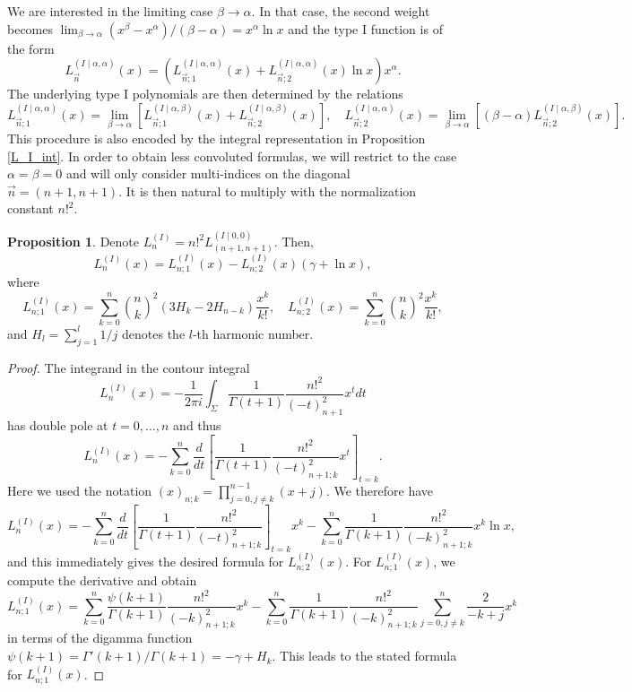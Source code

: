 \documentclass[a4paper,12pt,oneside]{article}
\theoremstyle{definition}
\newtheorem{prop}[defi]{Proposition}
\begin{document}
We are interested in the limiting case $\beta\to\alpha$. In that case, the second weight becomes  $\lim_{\beta\to\alpha} (x^\beta-x^\alpha)/(\beta-\alpha) = x^\alpha \ln x $
and the type I function is of the form
$$L_{\vec{n}}^{(I\mid \alpha,\alpha)}(x) = (L_{\vec{n};1}^{(I\mid \alpha,\alpha)}(x) + L_{\vec{n};2}^{(I\mid \alpha,\alpha)}(x) \ln x) x^\alpha. $$
The underlying type I polynomials are then determined by the relations
$$L_{\vec{n};1}^{(I\mid \alpha,\alpha)}(x) = \lim_{\beta\to\alpha} [L_{\vec{n};1}^{(I\mid \alpha,\beta)}(x)+L_{\vec{n};2}^{(I\mid \alpha,\beta)}(x)],
\quad  L_{\vec{n};2}^{(I\mid \alpha,\alpha)}(x) = \lim_{\beta\to\alpha} [(\beta-\alpha)L_{\vec{n};2}^{(I\mid \alpha,\beta)}(x)].$$
This procedure is also encoded by the integral representation in Proposition \ref{L_I_int}. In order to obtain less convoluted formulas, we will restrict to the case $\alpha=\beta=0$ and will only consider multi-indices on the diagonal $\vec{n}=(n+1,n+1)$. It is then natural to multiply with the normalization constant $n!^2$.

\begin{prop} \label{L_I_form}
    Denote $L_{n}^{(I)} = n!^2 L_{(n+1,n+1)}^{(I\mid 0,0)}$. Then,
    $$L_{n}^{(I)}(x) = L_{n;1}^{(I)}(x) - L_{n;2}^{(I)}(x) (\gamma + \ln x),$$
    where
    $$L_{n;1}^{(I)}(x) = \sum_{k=0}^{n} \binom{n}{k}^2 \left(  3 H_k - 2 H_{n-k} \right) \frac{x^k}{k!}, \quad    L_{n;2}^{(I)}(x) = \sum_{k=0}^{n} \binom{n}{k}^2 \frac{x^k}{k!},$$
    and $H_l = \sum_{j=1}^l 1/j$ denotes the $l$-th harmonic number.
\end{prop}
\begin{proof}
    The integrand in the contour integral
    $$ L_{n}^{(I)}(x) = - \frac{1}{2\pi i} \int_\Sigma \frac{1}{\Gamma(t+1)} \frac{n!^2}{(-t)_{n+1}^2} x^t dt $$
    has double pole at $t=0,\dots,n$ and thus
    $$L_{n}^{(I)}(x) = - \sum_{k=0}^n \frac{d}{dt}\left[\frac{1}{\Gamma(t+1)} \frac{n!^2}{(-t)_{n+1;k}^2} x^t\right]_{t=k}. $$
   Here we used the notation $(x)_{n;k} = \prod_{j=0,j\neq k}^{n-1} (x+j)$. We therefore have
        $$L_{n}^{(I)}(x) = -  \sum_{k=0}^n \frac{d}{dt}\left[\frac{1}{\Gamma(t+1)} \frac{n!^2}{(-t)_{n+1;k}^2}\right]_{t=k} x^k - \sum_{k=0}^n \frac{1}{\Gamma(k+1)} \frac{n!^2}{(-k)_{n+1;k}^2} x^k \ln x, $$
    and this immediately gives the desired formula for $L_{n;2}^{(I)}(x)$. For $L_{n;1}^{(I)}(x)$, we compute the derivative and obtain
        $$L_{n;1}^{(I)}(x) = \sum_{k=0}^n \frac{\psi(k+1)}{\Gamma(k+1)} \frac{n!^2}{(-k)_{n+1;k}^2} x^k - \sum_{k=0}^n \frac{1}{\Gamma(k+1)} \frac{n!^2}{(-k)_{n+1;k}^2} \sum_{j=0,j\neq k}^n \frac{2}{-k+j} x^k$$
    in terms of the digamma function $\psi(k+1) = \Gamma'(k+1)/\Gamma(k+1) = - \gamma + H_k$. This leads to the stated formula for $L_{n;1}^{(I)}(x)$.
\end{proof}
\end{document}

